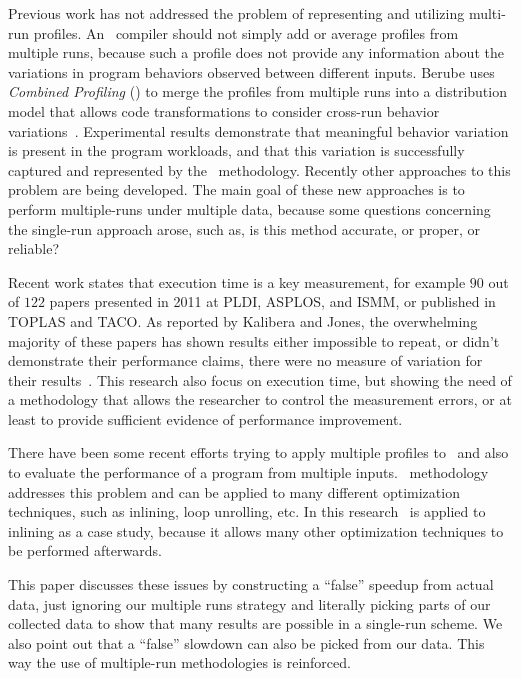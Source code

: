 Previous work has not addressed the problem of representing and utilizing multi-run profiles.  An \FDO\ compiler should not simply add or average profiles from multiple runs, because such a profile does not provide any information about the variations in program behaviors observed between different inputs. Berube uses {\it Combined Profiling} (\CP) to merge the profiles from multiple runs into a distribution model that allows code transformations to consider cross-run behavior variations~\cite{BerubePhD}.  Experimental results demonstrate that meaningful behavior variation is present in the program workloads, and that this variation is successfully captured and represented by the \CP\ methodology.
Recently other approaches to this problem are being developed. 
The main goal of these new approaches is to perform multiple-runs under multiple data, because some questions concerning the single-run approach arose, such as, is this method accurate, or proper, or reliable?

Recent work \cite{Kalibera2013} states that execution time is a key measurement, for example $90$ out of $122$ papers presented in 2011 at PLDI, ASPLOS, and ISMM, or published in TOPLAS and TACO. As reported by Kalibera and Jones, the overwhelming majority of these papers has shown results either impossible to repeat, or didn't demonstrate their performance claims, there were no measure of variation for their results~\cite{Kalibera2013}. This research also focus on execution time, but showing the need of a methodology that allows the researcher to control the measurement errors, or at least to provide sufficient evidence of performance improvement.


There have been some recent efforts trying to apply multiple profiles to \FDO\, and also to evaluate the performance of a program from multiple inputs. \CP\ methodology addresses this problem and can be applied to many different optimization techniques, such as inlining, loop unrolling, etc. In this research \CP\ is applied to inlining as a case study, because it allows many other optimization techniques to be performed afterwards.

This paper discusses these issues by constructing a ``false'' speedup from actual data, just ignoring our multiple runs strategy and literally picking parts of our collected data to show that many results are possible in a single-run scheme. We also point out that a ``false'' slowdown can also be picked from our data. This way the use of multiple-run methodologies is reinforced.

